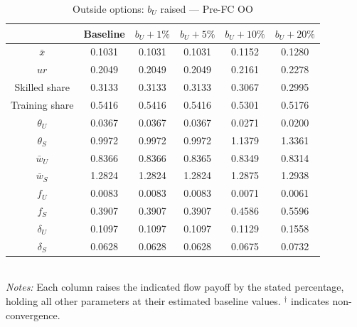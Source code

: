 \begin{table}[htbp]
\centering
\caption{Outside options: \(b_U\) raised — Pre-FC OO}
\label{tab:oo_bU_pre-fc_oo}
\small
\begin{tabular}{c c c c c c}
\toprule
  & Baseline & $b_U +1\%$ & $b_U +5\%$ & $b_U +10\%$ & $b_U +20\%$ \\
\midrule
\(\bar{x}\) & 0.1031 & 0.1031 & 0.1031 & 0.1152 & 0.1280 \\
\(ur\) & 0.2049 & 0.2049 & 0.2049 & 0.2161 & 0.2278 \\
Skilled share & 0.3133 & 0.3133 & 0.3133 & 0.3067 & 0.2995 \\
Training share & 0.5416 & 0.5416 & 0.5416 & 0.5301 & 0.5176 \\
\(\theta_U\) & 0.0367 & 0.0367 & 0.0367 & 0.0271 & 0.0200 \\
\(\theta_S\) & 0.9972 & 0.9972 & 0.9972 & 1.1379 & 1.3361 \\
\(\bar{w}_U\) & 0.8366 & 0.8366 & 0.8365 & 0.8349 & 0.8314 \\
\(\bar{w}_S\) & 1.2824 & 1.2824 & 1.2824 & 1.2875 & 1.2938 \\
\(f_U\) & 0.0083 & 0.0083 & 0.0083 & 0.0071 & 0.0061 \\
\(f_S\) & 0.3907 & 0.3907 & 0.3907 & 0.4586 & 0.5596 \\
\(\delta_U\) & 0.1097 & 0.1097 & 0.1097 & 0.1129 & 0.1558 \\
\(\delta_S\) & 0.0628 & 0.0628 & 0.0628 & 0.0675 & 0.0732 \\
\bottomrule
\end{tabular}
\\[2pt]
\footnotesize
\textit{Notes:} Each column raises the indicated flow payoff by the stated percentage, holding all other parameters at their estimated baseline values. \(^{\dagger}\) indicates non-convergence.
\end{table}
